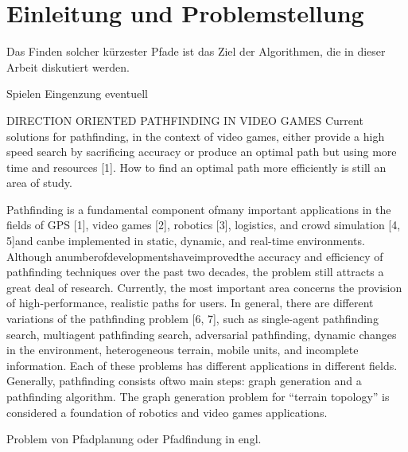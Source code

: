 \chapter{Einleitung und Problemstellung}


Das Finden solcher kürzester Pfade ist das Ziel der Algorithmen, die in dieser Arbeit diskutiert werden.

Spielen Eingenzung eventuell

DIRECTION ORIENTED PATHFINDING IN VIDEO GAMES
Current solutions for pathfinding, in the context of video games, either provide a high speed search by sacrificing accuracy or produce an optimal path but using more time and resources [1]. How to find an optimal path more efficiently is still an area of study.


Pathfinding is a fundamental component ofmany important applications in the fields of GPS [1], video games [2], robotics [3], logistics, and crowd simulation [4, 5]and canbe implemented in static, dynamic, and real-time environments. Although anumberofdevelopmentshaveimprovedthe accuracy and efficiency of pathfinding techniques over the past two decades, the problem still attracts a great deal of research. Currently, the most important area concerns the provision of high-performance, realistic paths for users. In general, there are different variations of the pathfinding problem [6, 7], such as single-agent pathfinding search, multiagent pathfinding search, adversarial pathfinding, dynamic changes in the environment, heterogeneous terrain, mobile units, and incomplete information. Each of these problems has different applications in different fields. Generally, pathfinding consists oftwo main steps: graph generation and a pathfinding algorithm.
The graph generation problem for “terrain topology” is considered a foundation of robotics and video games applications.

Problem von Pfadplanung oder Pfadfindung in engl.

